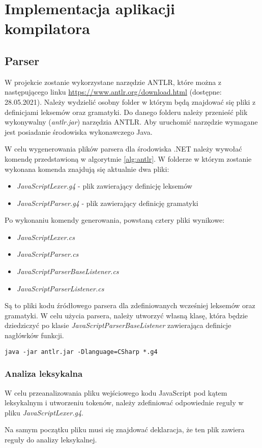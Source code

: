 \chapter{Implementacja aplikacji kompilatora}
\label{rozdzial3}

\section{Parser}
\par W projekcie zostanie wykorzystane narzędzie ANTLR, które można z następującego linku \url{https://www.antlr.org/download.html} (dostępne: 28.05.2021). Należy wydzielić osobny folder w którym będą znajdować się pliki z definicjami leksemów oraz gramatyki. Do danego folderu należy przenieść plik wykonywalny (\textit{antlr.jar}) narzędzia ANTLR. Aby uruchomić narzędzie wymagane jest posiadanie środowiska wykonawczego Java.
\par W celu wygenerowania plików parsera dla środowiska .NET należy wywołać komendę przedstawioną w algorytmie \ref{alg:antlr}. W folderze w którym zostanie wykonana komenda znajdują się aktualnie dwa pliki: 
\begin{itemize}
  \item \textit{JavaScriptLexer.g4} - plik zawierający definicję leksemów
  \item \textit{JavaScriptParser.g4} - plik zawierający definicję gramatyki
\end{itemize}
Po wykonaniu komendy generowania, powstaną cztery pliki wynikowe: 
\begin{itemize}
  \item \textit{JavaScriptLexer.cs}
  \item \textit{JavaScriptParser.cs}
  \item \textit{JavaScriptParserBaseListener.cs}
  \item \textit{JavaScriptParserListener.cs}
\end{itemize}
Są to pliki kodu źródłowego parsera dla zdefiniowanych wcześniej leksemów oraz gramatyki. W celu użycia parsera, należy utworzyć własną klasę, która będzie dziedziczyć po klasie \textit{JavaScriptParserBaseListener} zawierająca definicje nagłówków funkcji.

\begin{lstlisting}[caption=Komenda uruchamiająca narzędzie ANTLR, label=alg:antlr]
  java -jar antlr.jar -Dlanguage=CSharp *.g4
\end{lstlisting}

\subsection{Analiza leksykalna}
\par W celu przeanalizowania pliku wejściowego kodu JavaScript pod kątem leksykalnym i utworzeniu tokenów, należy zdefiniować odpowiednie reguły w pliku \textit{JavaScriptLexer.g4}. 
\par Na samym początku pliku musi się znajdować deklaracja, że ten plik zawiera reguły do analizy leksykalnej. 


